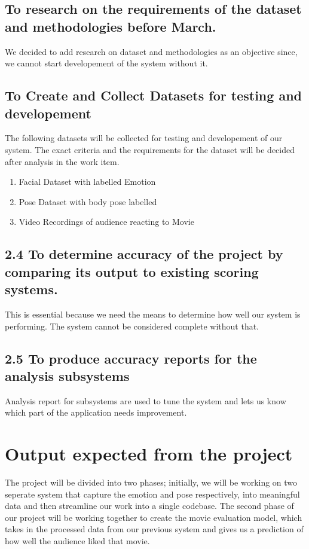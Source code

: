 \documentclass[12pt,a4paper,man]{report}
\begin{document}
\subsection{To research on the requirements of the dataset and methodologies before March.}
\label{sec:orgd75391f}
We decided to add research on dataset and methodologies as an objective since, we cannot start developement of the system without it.

\subsection{To Create and Collect Datasets for testing and developement}
\label{sec:org1f56ef5}
The following datasets will be collected for testing and developement of our system. The exact criteria and the requirements for the dataset will be decided after analysis in the work item.
\begin{enumerate}
\item Facial Dataset with labelled Emotion
\item Pose Dataset with body pose labelled
\item Video Recordings of audience reacting to Movie
\end{enumerate}

\subsection{2.4 To determine accuracy of the project by comparing its output to existing scoring systems.}
\label{sec:orgbf73647}
This is essential because we need the means to determine how well our system is performing. The system cannot be considered complete without that.
\subsection{2.5 To produce accuracy reports for the analysis subsystems}
\label{sec:org77b3a80}
Analysis report for subsystems are used to tune the system and lets us know which part of the application needs improvement. 

\section{Output expected from the project}
\label{sec:org6b590ff}

The project will be divided into two phases; initially, we will be working on two seperate system that capture the emotion and pose respectively, into meaningful data and then streamline our work into a single codebase. The second phase of our project will be working together to create the movie evaluation model, which takes in the processed data from our previous system and gives us a prediction of how well the audience liked that movie. 
\end{document}
